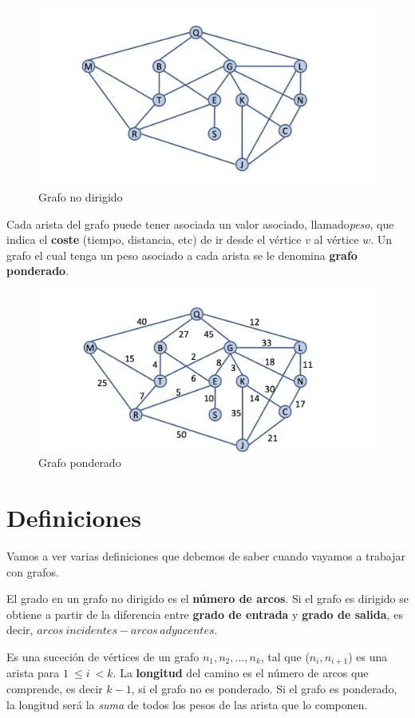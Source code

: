 \begin{figure}[h]
  \begin{center}
    \includegraphics[width=.6\textwidth]{assets/intrografo2.png}
  \end{center}
  \caption{Grafo no dirigido}
\end{figure}

Cada arista del grafo puede tener asociada un valor asociado, llamado\textit{peso}, que indica el \textbf{coste} (tiempo, distancia, etc) de ir desde el vértice \(v\) al vértice \(w\). Un grafo el cual tenga un peso asociado a cada arista se le denomina \textbf{grafo ponderado}.
\begin{figure}[h]
  \begin{center}
    \includegraphics[width=.7\textwidth]{assets/intrografo3.png}
  \end{center}
  \caption{Grafo ponderado}
\end{figure}

\section{Definiciones }
Vamos a ver varias definiciones que debemos de saber cuando vayamos a trabajar con grafos.

 El grado en un grafo no dirigido es el \textbf{número de arcos}. Si el grafo es dirigido se obtiene a partir de la diferencia entre \textbf{grado de entrada} y \textbf{grado de salida}, es decir, \(arcos\ incidentes - arcos\ adyacentes\).

 Es una suceción de vértices de un grafo \(n_1, n_2,...,n_k\), tal que (\(n_i, n_{i+1}\)) es una arista para \(1\ \leq i\ < k\). La \textbf{longitud} del camino es el número de arcos que comprende, es decir \(k-1\), si el grafo no es ponderado. Si el grafo es ponderado, la longitud será la \textit{suma} de todos los pesos de las arista que lo componen.

